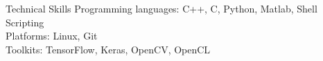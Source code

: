 \documentclass{resume} %
\begin{document}








\begin{rSection}{Technical Skills}
Programming languages: C++, C, Python, Matlab, Shell Scripting\\
Platforms: Linux, Git  \\
Toolkits: TensorFlow, Keras, OpenCV, OpenCL\\

\end{rSection}





\end{document}
